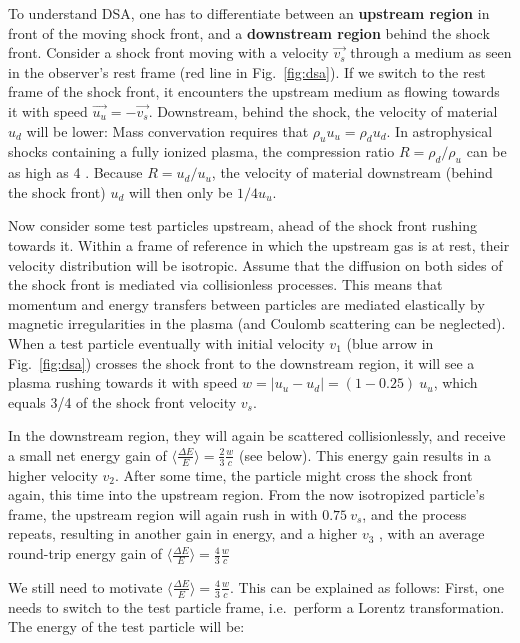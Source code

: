 To understand DSA, one has to differentiate between an \textbf{upstream region} in front of the moving shock front, and a \textbf{downstream region} behind the shock front. Consider a shock front moving with a velocity $\vec{v_s}$ through a medium as seen in the observer's rest frame (red line in Fig.~\ref{fig:dsa}). If we switch to the rest frame of the shock front, it encounters the upstream medium as flowing towards it with speed $\vec{u_u}=-\vec{v_s}$. Downstream, behind the shock, the velocity of material $u_d$ will be lower: Mass convervation requires that $\rho_u u_u = \rho_d u_d$. In astrophysical shocks containing a fully ionized plasma, the compression ratio $R=\rho_d/\rho_u$ can be as high as 4 . Because $R=u_d/u_u$, the velocity of material downstream (behind the shock front) $u_d$ will then only be $1/4 u_u$.

Now consider some test particles upstream, ahead of the shock front rushing towards it. Within a frame of reference in which the upstream gas is at rest, their velocity distribution will be isotropic. Assume that the diffusion on both sides of the shock front is mediated via collisionless processes. This means that momentum and energy transfers between particles are mediated elastically by magnetic irregularities in the plasma (and Coulomb scattering can be neglected). When a test particle eventually with initial velocity $v_1$ (blue arrow in Fig.~\ref{fig:dsa}) crosses the shock front to the downstream region, it will see a plasma rushing towards it with speed $w=|u_u-u_d| = (1-0.25)~u_u$, which equals 3/4 of the shock front velocity $v_s$.

In the downstream region, they will again be scattered collisionlessly, and receive a small net energy gain of $\big\langle\frac{\Delta E}{E}\big\rangle = \frac{2}{3}\frac{w}{c}$ (see below). This energy gain results in a higher velocity $v_2$. After some time, the particle might cross the shock front again, this time into the upstream region. From the now isotropized particle's frame, the upstream region will again rush in with $0.75~v_s$, and the process repeats, resulting in another gain in energy, and a higher $v_3$ , with an average round-trip energy gain of $\big\langle\frac{\Delta E}{E}\big\rangle = \frac{4}{3}\frac{w}{c}$

We still need to motivate $\big\langle\frac{\Delta E}{E}\big\rangle = \frac{4}{3}\frac{w}{c}$. This can be explained as follows: First, one needs to switch to the test particle frame, i.e.\ perform a Lorentz transformation. The energy of the test particle will be:

